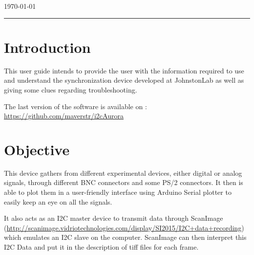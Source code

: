 \documentclass[a4paper]{article}
\begin{document}
\begin{titlepage}


{\large \today}\\[2cm] %


\vfill %

\end{titlepage}


\noindent\rule{\textwidth}{1pt}

\tableofcontents

\newpage

\listoffigures

\newpage



\section{Introduction}
This user guide intends to provide the user with the information required to use and understand the synchronization device developed at JohnstonLab as well as giving some clues regarding troubleshooting.

The last version of the software is available on : \url{https://github.com/maverstr/i2cAurora}

\section{Objective}
This device gathers from different experimental devices, either digital or analog signals, through different BNC connectors and some PS/2 connectors. 
It then is able to plot them in a user-friendly interface using Arduino Serial plotter to easily keep an eye on all the signals.

It also acts as an I2C master device to transmit data through ScanImage (\url{http://scanimage.vidriotechnologies.com/display/SI2015/I2C+data+recording}) which emulates an I2C slave on the computer.
ScanImage can then interpret this I2C Data and put it in the description of tiff files for each frame.
\end{document}
